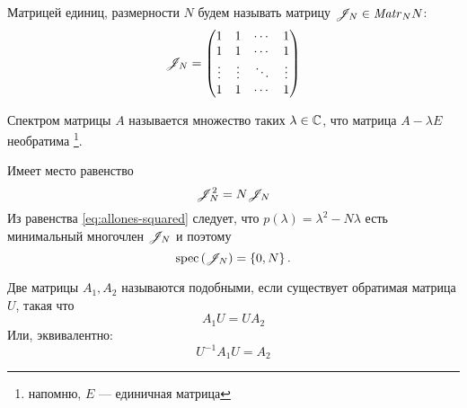 Матрицей единиц, размерности \( N \) будем называть матрицу
\( \mathscr{J}_{N} \in \mathit{Matr}_{N} {N} \):
\[
    \mathscr{J}_{N} =
    \begin{pmatrix}
    1 & 1  & \cdots & 1 \\
    1 & 1  & \cdots & 1 \\
    \vdots & \vdots & \ddots & \vdots \\
    1 & 1  & \cdots & 1
    \end{pmatrix}
\]

Спектром матрицы \( A \) называется множество таких \( \lambda\in\mathbb{C} \),
что матрица \( {A - \lambda E} \) необратима \footnote{напомню, \( E \) --- единичная матрица}.

\begin{lemma}
    Имеет место равенство
    \begin{equation}\label{eq:allones-squared}
        \mathscr{J}_{N}^2 = N \mathscr{J}_{N}
    \end{equation}
    Из равенства \eqref{eq:allones-squared} следует, что
    \( p(\lambda) = \lambda^2-N\lambda \)
    есть минимальный многочлен \( \mathscr{J}_{N} \) и поэтому
    \[
        \mathrm{spec}\left({\mathscr{J}_{N}}\right) = \left\{ 0, N \right\}.
    \]
\end{lemma}

\begin{dfn}
    Две матрицы \( A_1, A_2 \)
    называются подобными, если существует обратимая матрица \( U \),
    такая что
    \[
        A_1 U = U A_2
        \]
    Или, эквивалентно:
    \[
        U^{-1} A_1 U = A_2
        \]
\end{dfn}

